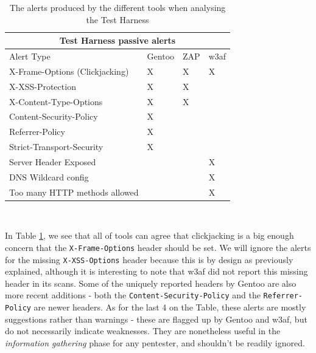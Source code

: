 \begin{table}[h]
	
	{

		\captionsetup{justification=centering}
		
		\caption{The alerts produced by the different tools when analysing the Test Harness}
		\label{table:test_harness_alerts}
		\begin{tabular}{ |p{7cm}|>{\centering\arraybackslash}m{2cm} |>{\centering\arraybackslash}m{2cm} |>{\centering\arraybackslash}m{2cm}| }
			\hline
			\multicolumn{4}{|c|}{\textbf{Test Harness passive alerts}} \\ [0.5ex]
			\hline \hline 
			Alert Type & Gentoo & ZAP & w3af \\
			\hline
			X-Frame-Options (Clickjacking) & X & X & X \\
			X-XSS-Protection & X & X & \\
			X-Content-Type-Options& X & X & \\
			Content-Security-Policy & X & & \\
			Referrer-Policy & X & & \\
			Strict-Transport-Security & X  & & \\
			Server Header Exposed & & & X\\
			DNS Wildcard config & & & X \\
			Too many HTTP methods allowed & & & X\\
			
			\hline
		\end{tabular}
	} \\
\end{table}

In Table \ref{table:test_harness_alerts}, we see that all of tools can agree that clickjacking is a big enough concern that the \texttt{X-Frame-Options} header should be set. We will ignore the alerts for the missing \texttt{X-XSS-Options} header because this is by design as previously explained, although it is interesting to note that w3af did not report this missing header in its scans. Some of the uniquely reported headers by Gentoo are also more recent additions - both the \texttt{Content-Security-Policy} and the \texttt{Referrer-Policy} are newer headers. As for the last 4 on the Table, these alerts are mostly suggestions rather than warnings - these are flagged up by Gentoo and w3af, but do not necessarily indicate weaknesses. They are nonetheless useful in the \textit{information gathering} phase for any pentester, and shouldn't be readily ignored. \\ 

